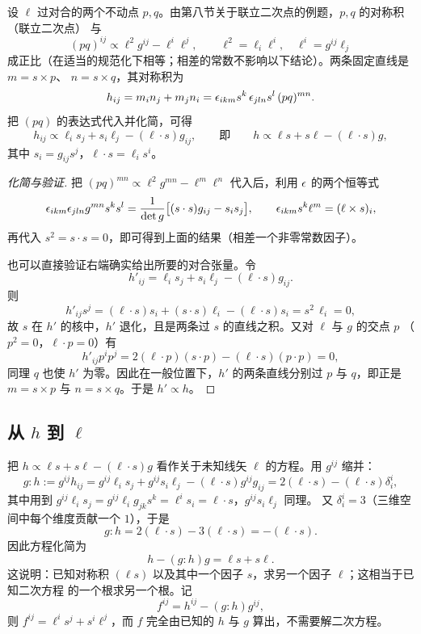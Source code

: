 设 $\ell$ 过对合的两个不动点 $p,q$。由第八节关于联立二次点的例题，$p,q$ 的对称积（联立二次点）
与
\[
(pq)^{ij}\propto\ell^2g^{ij}-\ell^i\ell^j,
\qquad \ell^2=\ell_i\ell^i,\quad \ell^i=g^{ij}\ell_j
\]
成正比（在适当的规范化下相等；相差的常数不影响以下结论）。两条固定直线是 $m=s\times p$、
$n=s\times q$，其对称积为
\[
h_{ij}=m_in_j+m_jn_i=\epsilon_{ikm}s^k\,\epsilon_{jln}s^l\,(pq)^{mn}.
\]
把 $(pq)$ 的表达式代入并化简，可得
\[
h_{ij}\propto\ell_is_j+s_i\ell_j-(\ell\cdot s)g_{ij},
\qquad\text{即}\qquad
h\propto\ell s+s\ell-(\ell\cdot s)g,
\]
其中 $s_i=g_{ij}s^j$，$\ell\cdot s=\ell_is^i$。

\begin{proof}[化简与验证]
把 $(pq)^{mn}\propto\ell^2g^{mn}-\ell^m\ell^n$ 代入后，利用 $\epsilon$ 的两个恒等式
\[
\epsilon_{ikm}\epsilon_{jln}g^{mn}s^ks^l=\frac{1}{\det g}\bigl[(s\cdot s)g_{ij}-s_is_j\bigr],
\qquad
\epsilon_{ikm}s^k\ell^m=(\ell\times s)_i,
\]
再代入 $s^2=s\cdot s=0$，即可得到上面的结果（相差一个非零常数因子）。

也可以直接验证右端确实给出所要的对合张量。令
\[
h'_{ij}=\ell_is_j+s_i\ell_j-(\ell\cdot s)g_{ij}.
\]
则
\[
h'_{ij}s^j=(\ell\cdot s)s_i+(s\cdot s)\ell_i-(\ell\cdot s)s_i=s^2\,\ell_i=0,
\]
故 $s$ 在 $h'$ 的核中，$h'$ 退化，且是两条过 $s$ 的直线之积。又对 $\ell$ 与 $g$ 的交点 $p$
（$p^2=0$，$\ell\cdot p=0$）有
\[
h'_{ij}p^ip^j=2(\ell\cdot p)(s\cdot p)-(\ell\cdot s)(p\cdot p)=0,
\]
同理 $q$ 也使 $h'$ 为零。因此在一般位置下，$h'$ 的两条直线分别过 $p$ 与 $q$，即正是
$m=s\times p$ 与 $n=s\times q$。于是 $h'\propto h$。
\end{proof}

\subsection{从 $h$ 到 $\ell$}

把 $h\propto\ell s+s\ell-(\ell\cdot s)g$ 看作关于未知线矢 $\ell$ 的方程。用 $g^{ij}$ 缩并：
\[
g:h:=g^{ij}h_{ij}
=g^{ij}\ell_is_j+g^{ij}s_i\ell_j-(\ell\cdot s)g^{ij}g_{ij}
=2(\ell\cdot s)-(\ell\cdot s)\delta^i_i,
\]
其中用到 $g^{ij}\ell_is_j=g^{ij}\ell_ig_{jk}s^k=\ell^is_i=\ell\cdot s$，$g^{ij}s_i\ell_j$ 同理。
又 $\delta^i_i=3$（三维空间中每个维度贡献一个 $1$），于是
\[
g:h=2(\ell\cdot s)-3(\ell\cdot s)=-(\ell\cdot s).
\]
因此方程化简为
\[
h-(g:h)g=\ell s+s\ell .
\]
这说明：已知对称积 $(\ell s)$ 以及其中一个因子 $s$，求另一个因子 $\ell$；这相当于已知二次方程
的一个根求另一个根。记
\[
f^{ij}=h^{ij}-(g:h)g^{ij},
\]
则 $f^{ij}=\ell^is^j+s^i\ell^j$，而 $f$ 完全由已知的 $h$ 与 $g$ 算出，不需要解二次方程。

